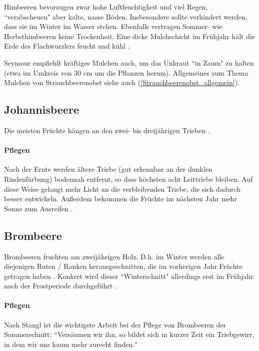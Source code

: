 Himbeeren bevorzugen zwar hohe Luftfeuchtigkeit und viel Regen, ``verabscheuen" aber kalte, nasse Böden.
Insbesondere sollte verhindert werden, dass sie im Winter im Wasser stehen.
Ebenfalls vertragen Sommer- wie Herbsthimbeeren keine Trockenheit.
Eine dicke Mulchschicht im Frühjahr hält die Erde des Flachwurzlers feucht und kühl \cite[S.~421]{Don2021}.

Seymour \cite[S.~176]{Seymour1978} empfiehlt kräftiges Mulchen auch, um das Unkraut ``in Zaum" zu halten (etwa im Umkreis von 30 cm um die Pflanzen herum).
Allgemeines zum Thema Mulchen von Strauchbeerenobst siehe auch (\ref{Strauchbeerenobst_allgemein}).

\subsection{Johannisbeere}
\label{Johannisbeere}

Die meisten Früchte hängen an den zwei- bis dreijährigen Trieben \cite[S.~108]{Heberer2018}.

\paragraph{Pflegen}

Nach der Ernte werden ältere Triebe (gut erkennbar an der dunklen Rindenfärbung) bodennah entfernt, so dass höchsten acht Leittriebe bleiben.
Auf diese Weise gelangt mehr Licht an die verbleibenden Triebe, die sich dadurch besser entwickeln.
Außerdem bekommen die Früchte im nächsten Jahr mehr Sonne zum Ausreifen \cite[S.~108]{Heberer2018}.

\subsection{Brombeere}
\label{Brombeere}

Brombeeren fruchten am zweijährigen Holz.
D.h. im Winter werden alle diejenigen Ruten / Ranken herausgeschnitten, die im vorherigen Jahr Früchte getragen haben \cite[S.~176]{Seymour1978}.
Konkret wird dieser ``Winterschnitt" allerdings erst im Frühjahr nach der Frostperiode durchgeführt \cite[S.~196]{Stangl1995}.

\paragraph{Pflegen}

Nach Stangl \cite[S.~196]{Stangl1995} ist die wichtigste Arbeit bei der Pflege von Brombeeren der Sommerschnitt:
``Versäumen wir ihn, so bildet sich in kurzer Zeit ein Triebgewirr, in dem wir uns kaum mehr zurecht finden."

